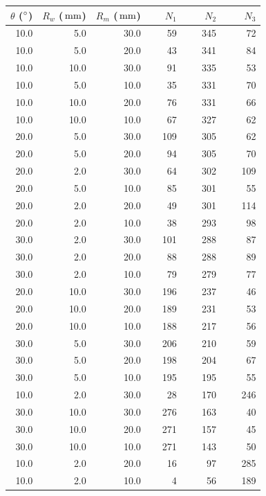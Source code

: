 \begin{table}
\centering
\begin{tabular}{*{6}{r}}
$\theta$ ($^\circ$) & $R_w$ ($\,\mathrm{mm}$) & $R_m$ ($\,\mathrm{mm}$) & $\phantom{000} $$N_1$  & $\phantom{000}$ $N_2$  & $\phantom{000}$ $N_3$  \\
\hline
\hline
10.0  & 5.0   & 30.0  & 59   & 345  & 72 \\
10.0  & 5.0   & 20.0  & 43   & 341  & 84 \\
10.0  & 10.0  & 30.0  & 91   & 335  & 53 \\
10.0  & 5.0   & 10.0  & 35   & 331  & 70 \\
10.0  & 10.0  & 20.0  & 76   & 331  & 66 \\
10.0  & 10.0  & 10.0  & 67   & 327  & 62 \\
20.0  & 5.0   & 30.0  & 109  & 305  & 62 \\
20.0  & 5.0   & 20.0  & 94   & 305  & 70 \\
20.0  & 2.0   & 30.0  & 64   & 302  & 109 \\
20.0  & 5.0   & 10.0  & 85   & 301  & 55 \\
20.0  & 2.0   & 20.0  & 49   & 301  & 114 \\
20.0  & 2.0   & 10.0  & 38   & 293  & 98 \\
30.0  & 2.0   & 30.0  & 101  & 288  & 87 \\
30.0  & 2.0   & 20.0  & 88   & 288  & 89 \\
30.0  & 2.0   & 10.0  & 79   & 279  & 77 \\
20.0  & 10.0  & 30.0  & 196  & 237  & 46 \\
20.0  & 10.0  & 20.0  & 189  & 231  & 53 \\
20.0  & 10.0  & 10.0  & 188  & 217  & 56 \\
30.0  & 5.0   & 30.0  & 206  & 210  & 59 \\
30.0  & 5.0   & 20.0  & 198  & 204  & 67 \\
30.0  & 5.0   & 10.0  & 195  & 195  & 55 \\
10.0  & 2.0   & 30.0  & 28   & 170  & 246 \\
30.0  & 10.0  & 30.0  & 276  & 163  & 40 \\
30.0  & 10.0  & 20.0  & 271  & 157  & 45 \\
30.0  & 10.0  & 10.0  & 271  & 143  & 50 \\
10.0  & 2.0   & 20.0  & 16   & 97   & 285 \\
10.0  & 2.0   & 10.0  & 4    & 56   & 189 \\
\hline
\end{tabular}

\end{table}
